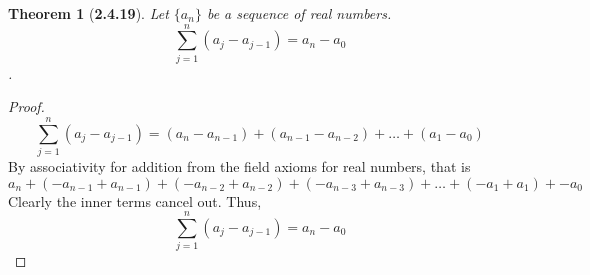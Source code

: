 \documentclass[a4paper, 12pt]{article}
\theoremstyle{plain}
\newtheorem*{theorem*}{Theorem}
\begin{document}
	
	\begin{theorem*}[\textbf{2.4.19}]
		Let $\{a_n\}$ be a sequence of real numbers.
		$$\sum_{j=1}^{n} (a_j - a_{j-1}) = a_n - a_0$$.
	\end{theorem*}
	
	\begin{proof}
		$$\sum_{j=1}^n (a_j - a_{j-1}) =
		(a_n - a_{n-1}) + (a_{n-1} - a_{n-2}) + \dots + (a_1 - a_0)$$ 
		By associativity for addition from the field axioms for real numbers, that is 
		$$a_n + (-a_{n-1} + a_{n-1}) + (-a_{n-2} + a_{n-2}) + (-a_{n-3} + a_{n-3}) + 
		\dots + (-a_1 + a_1) + -a_0$$ 
		Clearly the inner terms cancel out. Thus, 
		$$\sum_{j=1}^{n} (a_j - a_{j-1}) = a_n - a_0$$
	\end{proof}
\end{document}
